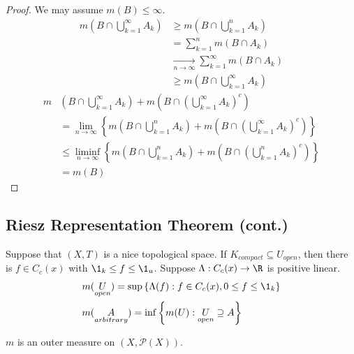 \begin{proof}
	We may assume $m(B) \leq \infty$.
	\begin{align*}
	  m \left(B \cap \bigcup_{k = 1}^{\infty} A_k \right) & \geq m \left(B \cap \bigcup_{k = 1}^{n} A_k \right) \\
		& = \sum_{k = 1}^{n} m(B \cap A_k) \tag{Step 3$'$} \\
		& \xrightarrow[n \to \infty]{} \sum_{k = 1}^{\infty} m(B \cap A_k) \\
		& \geq m \left( B \cap \bigcup_{k = 1}^{\infty} A_k \right)
	\end{align*}
	\begin{align*}
	  m & \left(B \cap \bigcup_{k = 1}^{\infty} A_k \right) + m \left(B \cap \left( \bigcup_{k = 1}^{\infty} A_k\right)^{c}\right) \\
		& = \lim_{n \to \infty} \left\{ m \left( B \cap \bigcup_{k = 1}^{n} A_k \right) + m \left(B \cap \left(\bigcup_{k = 1}^{\infty} A_k\right)^{c}\right)\right\} \\
		& \leq \liminf_{n \to \infty} \left\{ m \left(B \cap \bigcup_{k = 1}^{n} A_k\right) + m \left(B \cap \left(\bigcup_{k = 1}^{n} A_k\right)^{c}\right)\right\} \\
		& = m(B)
	\end{align*}
\end{proof}

\subsection{Riesz Representation Theorem (cont.)}

Suppose that $(X,T)$ is a  nice topological space.
If $K_{compact} \subseteq U_{open}$, then there is $f \in C_c(x)$ with $\1_k \leq f \leq \1_u$.
Suppose $\Lambda : C_c(x) \to \R$ is positive linear.
\begin{align*}
  & m(\underset{open}{U}) = \sup \left\{\Lambda(f) : f \in C_c(x), 0 \leq f \leq \1_k \right\} \\
  & m(\underset{arbitrary}{A}) = \inf \left\{ m(U): \underset{open}{U} \contains A\right\} \\
\end{align*}

\begin{lemma}
  $m$ is an outer measure on $(X, \mathcal{P}(X))$.
\end{lemma}

